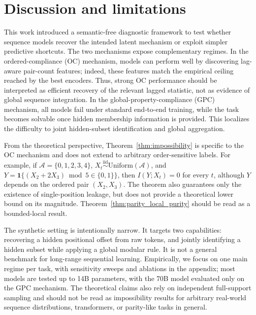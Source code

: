 \documentclass{article}
\theoremstyle{plain}
\theoremstyle{definition}
\theoremstyle{remark}
\begin{document}


\section{Discussion and limitations}
 \label{sec:limitations}
This work introduced a semantic-free diagnostic framework to test whether sequence models recover the intended latent mechanism or exploit simpler predictive shortcuts. The two mechanisms expose complementary regimes. In the ordered-compliance (OC) mechanism, models can perform well by discovering lag-aware pair-count features; indeed, these features match the empirical ceiling reached by the best encoders. Thus, strong OC performance should be interpreted as efficient recovery of the relevant lagged statistic, not as evidence of global sequence integration. In the global-property-compliance (GPC) mechanism, all models fail under standard end-to-end training, while the task becomes solvable once hidden membership information is provided. This localizes the difficulty to joint hidden-subset identification and global aggregation. 

From the theoretical perspective, Theorem~\ref{thm:impossibility} is specific to the OC mechanism and does not extend to arbitrary order-sensitive labels. For example, if $\mathcal{A}=\{0,1,2,3,4\}$, $X_t \overset{\mathrm{iid}}{\sim} \mathrm{Uniform}(\mathcal{A})$, and $Y=\mathbf{1}\{(X_2+2X_3)\bmod 5 \in \{0,1\}\}$, then $I(Y;X_t)=0$ for every $t$, although $Y$ depends on the ordered pair $(X_2,X_3)$. The theorem also guarantees only the existence of single-position leakage, but does not provide a theoretical lower bound on its magnitude. Theorem~\ref{thm:parity_local_purity} should be read as a bounded-local result.

The synthetic setting is intentionally narrow. It targets two capabilities: recovering a hidden positional offset from raw tokens, and jointly identifying a hidden subset while applying a global modular rule. It is not a general benchmark for long-range sequential learning. Empirically, we focus on one main regime per task, with sensitivity sweeps and ablations in the appendix; most models are tested up to 14B parameters, with the 70B model evaluated only on the GPC mechanism. The theoretical claims also rely on independent full-support sampling and should not be read as impossibility results for arbitrary real-world sequence distributions, transformers, or parity-like tasks in general.
\end{document}
